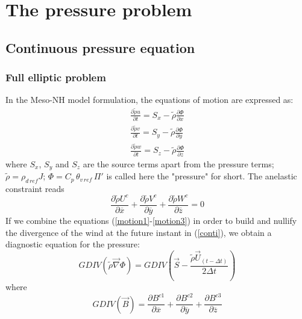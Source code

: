 \chapter{The pressure problem}
\minitoc


\section{Continuous pressure equation}
\subsection{Full elliptic problem}
\par In the  Meso-NH model formulation, the equations of motion are
expressed as:
\begin{eqnarray}
\label{motion1}
\frac {\partial{\tilde{\rho} { u }} } {\partial{t} } = S_x - \tilde{\rho}
\frac{\partial{\Phi} }{\partial{x} } \\
\label{motion2}
\frac {\partial{\tilde{\rho} { v }} } {\partial{t} } = S_y - \tilde{\rho}
\frac{\partial{\Phi} }{\partial y} \\
\label{motion3}
\frac {\partial{\tilde{\rho} {w}} } {\partial{t} } = S_z - \tilde{\rho}
\frac{\partial{\Phi} }{\partial z}
\end{eqnarray}
where $S_x$, $S_y$ and $S_z$ are the source terms apart from the
pressure terms; $\tilde{\rho} = \rho_{d\,ref} J$; $\Phi = C_p \,
\theta_{v\,ref}\,\Pi '$ is called here the "pressure" for short.
The anelastic constraint reads\\
\begin{equation}
\label{conti}
     \dfrac {\partial{\tilde{\rho} U^{c} } } {\partial{\overline{x} } }
   + \dfrac {\partial{\tilde{\rho} V^{c} } } {\partial{\overline{y} } }
   + \dfrac {\partial{\tilde{\rho} W^{c} } } {\partial{\overline{z} } } = 0
\end{equation}
If we combine the equations (\ref{motion1}-\ref{motion3}) in order to build and
nullify the divergence of the wind at the future instant in (\ref{conti}), we
obtain a diagnostic equation for the pressure:
\begin{equation}
\label{conteq}
GDIV(\tilde{\rho}  \overrightarrow{\nabla} \Phi) = GDIV \left(
\overrightarrow {S} -
\dfrac{\tilde{\rho} \vec{U}_{(t-\Delta t)} }
{2 \Delta t}
\right)
\end{equation}
where
\begin{displaymath}
GDIV(\vec{B}) = \dfrac {\partial{ B^{c1} } } {\partial{\overline{x} } }
               + \dfrac {\partial{ B^{c2} } } {\partial{\overline{y} } }
               + \dfrac {\partial{ B^{c3} } } {\partial{\overline{z} } }
\end{displaymath}

